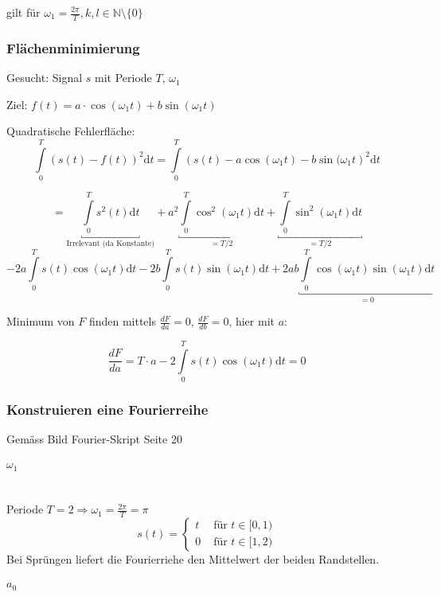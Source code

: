 gilt für $\omega_1 = \frac{2\pi}{T}, k,l \in \mathbb{N} \setminus{\{0\}}$

\subsubsection{Flächenminimierung}


Gesucht: Signal $s$ mit Periode $T$, $\omega_1$

Ziel: $f(t) = a \cdot \cos(\omega_1 t) + b \sin(\omega_1 t)$

Quadratische Fehlerfläche:
\[
	\int\limits^T_0 \left(s(t) - f(t)\right)^2 \mathrm{d}t = \int\limits^T_0\left(s(t) - a \cos(\omega_1 t) - b \sin(\omega_1 t\right)^2 \mathrm{d}t
\]

\[
	= \underbracket{\int\limits^T_0 s^2(t) \mathrm{d}t}_\text{Irrelevant (da Konstante)} + a^2 \underbracket{\int\limits^T_0 \cos^2(\omega_1 t) \mathrm{d}t}_{=T/2} + \underbracket{\int\limits^T_0 \sin^2(\omega_1t)\mathrm{d}t}_{=T/2} \]\[
	- 2a \int\limits^T_0 s(t) \cos(\omega_1 t) \mathrm{d}t - 2b \int\limits^T_0 s(t) \sin(\omega_1 t) \mathrm{d}t + 2ab \underbracket{\int\limits^T_0 \cos(\omega_1 t) \sin(\omega_1t) \mathrm{d}t}_{=0}
\]

Minimum von $F$ finden mittels $\frac{dF}{da}=0$, $\frac{dF}{db} = 0$, hier mit $a$:

\[
	\frac{dF}{da} = T \cdot a - 2 \int\limits^T_0 s(t) \cos(\omega_1 t) \mathrm{d}t = 0
\]


\subsubsection{Konstruieren eine Fourierreihe}

Gemäss Bild Fourier-Skript Seite 20

\paragraph{$\omega_1$} \hfill \\

Periode $T=2 \Rightarrow \omega_1 = \frac{2 \pi}{T} = \pi$
\[
s(t) = \begin{cases}
	t & \text{ für } t \in [0,1) \\
	0 & \text{ für } t \in [1,2)
\end{cases}
\]
Bei Sprüngen liefert die Fourierriehe den Mittelwert der beiden Randstellen.

\paragraph{$a_0$}

